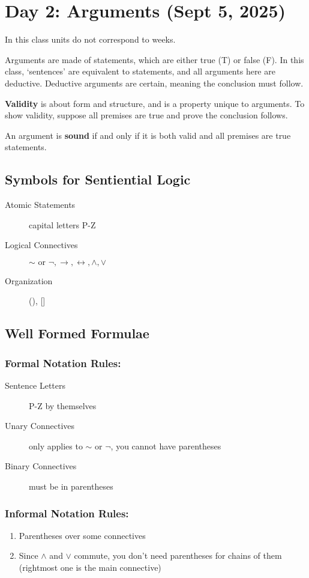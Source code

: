 \section{Day 2: Arguments (Sept 5, 2025)}

In this class units do not correspond to weeks.

Arguments are made of statements, which are either true (T) or false (F). In this class, `sentences' are equivalent to statements, and all arguments here are deductive. Deductive arguments are certain, meaning the conclusion must follow.

\textbf{Validity} is about form and structure, and is a property unique to arguments. To show validity, suppose all premises are true and prove the conclusion follows.

An argument is \textbf{sound} if and only if it is both valid and all premises are true statements.

\subsection{Symbols for Sentiential Logic}
\begin{description}
    \item[Atomic Statements] capital letters P-Z
    \item[Logical Connectives] $\sim \text{ or } \neg, \to , \leftrightarrow, \wedge, \vee$
    \item[Organization] {(), []}
\end{description}

\subsection{Well Formed Formulae}
\subsubsection*{Formal Notation Rules:}
\begin{description}
    \item[Sentence Letters] P-Z by themselves
    \item[Unary Connectives] only applies to $\sim$ or $\neg$, you cannot have parentheses
    \item[Binary Connectives] must be in parentheses
\end{description}
\subsubsection*{Informal Notation Rules:}
\begin{enumerate}
\item Parentheses over some connectives
\item Since $\wedge$ and $\vee$ commute, you don't need parentheses for chains of them (rightmost one is the main connective)
\end{enumerate}

